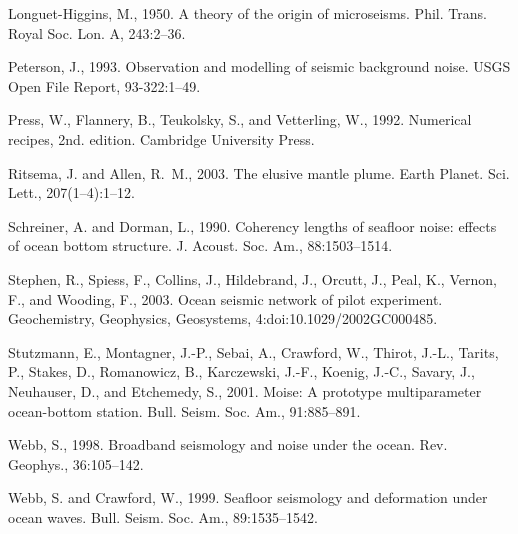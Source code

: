 \documentclass{article}
\begin{document}
{\begin{thebibliography}{}
Longuet-Higgins, M., 1950.
\newblock A theory of the origin of microseisms.
\newblock Phil. Trans. Royal Soc. Lon. A, 243:2--36.

Peterson, J., 1993.
\newblock Observation and modelling of seismic background noise.
\newblock USGS Open File Report, 93-322:1--49.

Press, W., Flannery, B., Teukolsky, S., and Vetterling, W., 1992.
\newblock Numerical recipes, 2nd. edition.
\newblock Cambridge University Press.

Ritsema, J. and Allen, R.~M., 2003.
\newblock The elusive mantle plume.
\newblock Earth Planet. Sci. Lett., 207(1--4):1--12.

Schreiner, A. and Dorman, L., 1990.
\newblock Coherency lengths of seafloor noise: effects of ocean bottom
  structure.
\newblock J. Acoust. Soc. Am., 88:1503--1514.

Stephen, R., Spiess, F., Collins, J., Hildebrand, J., Orcutt, J., Peal, K.,
  Vernon, F., and Wooding, F., 2003.
\newblock Ocean seismic network of pilot experiment.
\newblock Geochemistry, Geophysics, Geosystems, 4:doi:10.1029/2002GC000485.

Stutzmann, E., Montagner, J.-P., Sebai, A., Crawford, W., Thirot, J.-L.,
  Tarits, P., Stakes, D., Romanowicz, B., Karczewski, J.-F., Koenig, J.-C.,
  Savary, J., Neuhauser, D., and Etchemedy, S., 2001.
\newblock Moise: A prototype multiparameter ocean-bottom station.
\newblock Bull. Seism. Soc. Am., 91:885--891.

Webb, S., 1998.
\newblock Broadband seismology and noise under the ocean.
\newblock Rev. Geophys., 36:105--142.

Webb, S. and Crawford, W., 1999.
\newblock Seafloor seismology and deformation under ocean waves.
\newblock Bull. Seism. Soc. Am., 89:1535--1542.

\end{thebibliography}
 

}
\end{document}
